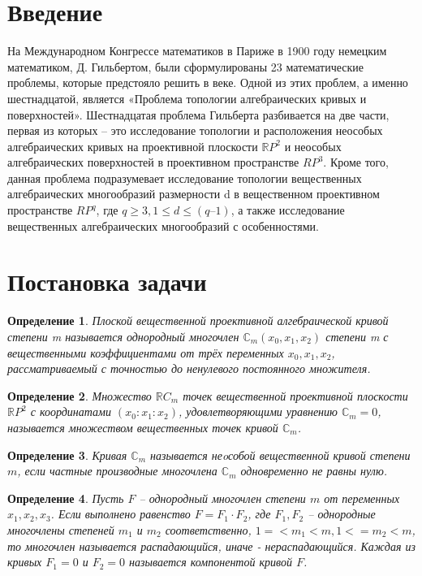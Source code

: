 \documentclass[11pt]{book}
\newtheorem{definition}{Определение}
\newcommand{\RomanNumeralCaps}[1]
    {\MakeUppercase{\romannumeral #1}}
\numberwithin{exercise}{chapter}
\begin{document}
\newpage
\section{Введение}


        На \RomanNumeralCaps{2} Международном Конгрессе математиков в Париже в 1900 году немецким математиком, Д. Гильбертом, были сформулированы 23 математические проблемы, которые предстояло решить в \RomanNumeralCaps{20} веке. Одной из этих проблем, а именно шестнадцатой, является «Проблема топологии алгебраических кривых и поверхностей». Шестнадцатая проблема Гильберта разбивается на две части, первая из которых – это исследование топологии и расположения неособых алгебраических кривых на проективной плоскости $\mathbb RP^2$ и неособых алгебраических поверхностей в проективном пространстве $RP^3$. Кроме того, данная проблема подразумевает исследование топологии вещественных алгебраических многообразий размерности d в вещественном проективном пространстве $RP^q$, где $q \geqslant 3, 1 \leqslant d \leqslant (q–1)$, а также исследование вещественных алгебраических многообразий с особенностями.
\newpage
\section{Постановка задачи}

\begin{definition}
 Плоской вещественной проективной алгебраической кривой степени m называется однородный многочлен $\mathbb C_m(x_0, x_1, x_2)$ степени m с вещественными коэффициентами от трёх переменных $x_0, x_1, x_2$, рассматриваемый с точностью до ненулевого постоянного множителя.
\end{definition}

\begin{definition}
Множество $\mathbb RC_m$ точек вещественной проективной плоскости $\mathbb RP^2$ с координатами $(x_0:x_1:x_2)$, удовлетворяющими уравнению $\mathbb C_m = 0$, называется множеством вещественных точек кривой $\mathbb C_m$.
\end{definition}

\begin{definition}
Кривая $\mathbb C_m$ называется неoсобой вещественной кривой степени $m$, если частные производные многочлена $\mathbb C_m$ одновременно не равны нулю.
\end{definition}

\begin{definition}
Пусть $F$ – однородный многочлен степени $m$ от переменных $x_1, x_2, x_3$. Если выполнено равенство $F = F_1 \cdot F_2$, где $F_1, F_2$ – однородные многочлены степеней $m_1$ и $m_2$ соответственно, $1 =< m_1 <m, 1 <= m_2 < m$, то многочлен называется распадающийся, иначе - нераспадающийся. Каждая из кривых $F_1 = 0$ и $F_2 = 0$ называется компонентой кривой $F$.
\end{definition}
\end{document}
